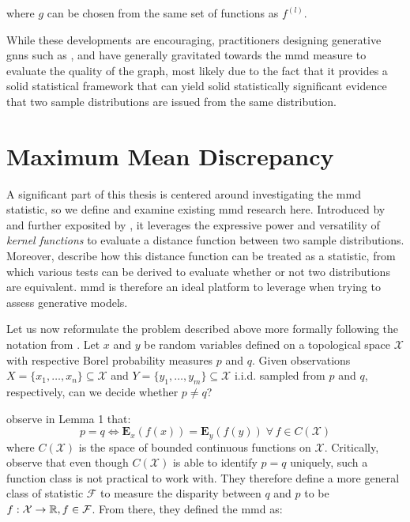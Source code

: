 where $g$ can be chosen from the same set of functions as $f^{(l)}$.

While these developments are encouraging, practitioners designing generative
\acrshort{gnns} such as \cite{liao2019efficient, niu2020permutation}, and
\cite{you2018graphrnn} have generally gravitated towards the \acrshort{mmd}
measure to evaluate the quality of the graph, most likely due to the fact that
it provides a solid statistical framework that can yield solid statistically
significant evidence that two sample distributions are issued from the same distribution.

\section{Maximum Mean Discrepancy}\label{sec:mmd} %

A significant part of this thesis is centered around investigating the
\acrshort{mmd} statistic, so we define and examine existing \acrshort{mmd}
research here. Introduced by \cite{borgwardt2006integrating} and further
exposited by \cite{gretton2012kernel}, it leverages the expressive power and
versatility of \emph{kernel functions} to evaluate a distance function between
two sample distributions. Moreover, \cite{gretton2012kernel} describe how this
distance function can be treated as a statistic, from which various tests can be
derived to evaluate whether or not two distributions are equivalent.
\acrshort{mmd} is therefore an ideal platform to leverage when trying to assess
generative models.

Let us now reformulate the problem described above more formally following the
notation from \cite{gretton2012kernel}. Let $x$ and $y$ be random variables
defined on a topological space $\mathcal{X}$ with respective Borel probability
measures $p$ and $q$. Given observations $X=\{x_1,\dots,
x_n\}\subseteq\mathcal{X}$ and $Y=\{y_1,\dots, y_m\}\subseteq\mathcal{X}$ i.i.d.
sampled from $p$ and $q$, respectively, can we decide whether $p\neq q$?

\cite{gretton2012kernel} observe in Lemma 1 that:
\begin{equation}
  \label{eq:lemma1_gretton12}
  p=q \iff \mathbf{E}_x(f(x))= \mathbf{E}_y(f(y))\;\forall\, f\in C(\mathcal{X})
  \end{equation}
where $C(\mathcal{X})$ is the space of bounded continuous functions on
$\mathcal{X}$. Critically, \cite{gretton2012kernel} observe that even though
$C(\mathcal{X})$ is able to identify $p=q$ uniquely, such a function class is
not practical to work with. They therefore define a more general class of
statistic $\mathcal{F}$ to measure the disparity between $q$ and $p$ to be
$f:\mathcal{X}\to\mathbb{R}, f\in\mathcal{F}$. From there, they defined the
\acrshort{mmd} as:

